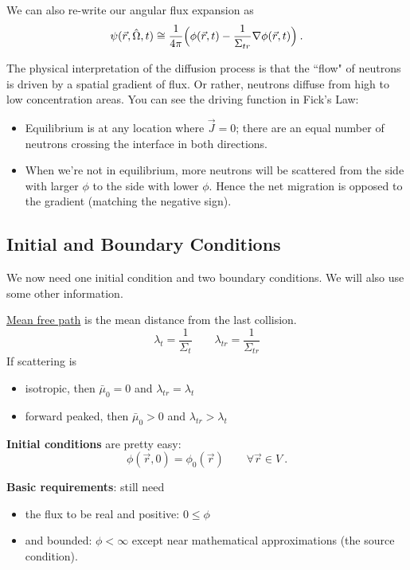 \documentclass[12pt]{article}
\newcommand{\vOmega}{\ensuremath{\hat{\Omega}}}
\begin{document}
We can also re-write our angular flux expansion as
\[\psi(\vec{r}, \vOmega, t) \cong \frac{1}{4\pi}\Bigl(\phi(\vec{r}, t)  -\frac{1}{\Sigma_{tr}} \nabla \phi(\vec{r}, t)\Bigr) \:.\]

The physical interpretation of the diffusion process is that the ``flow" of neutrons is driven by a spatial gradient of flux. Or rather, neutrons diffuse from high to low concentration areas. You can see the driving function in Fick's Law: 
%
\begin{itemize}
\item Equilibrium is at any location where $\vec{J} = 0$; there are an equal number of neutrons crossing the interface in both directions.
\item When we're not in equilibrium, more neutrons will be scattered from the side with larger $\phi$ to the side with lower $\phi$. Hence the net migration is opposed to the gradient (matching the negative sign). 
\end{itemize}
 

\subsection*{Initial and Boundary Conditions}

We now need one initial condition and two boundary conditions. We will also use some other information.

\underline{Mean free path} is the mean distance from the last collision.
\[\lambda_{t} = \frac{1}{\Sigma_t} \qquad \lambda_{tr} = \frac{1}{\Sigma_{tr}}\]
%
If scattering is 
\begin{itemize}
\item isotropic, then $\bar{\mu}_0 = 0$ and $\lambda_{tr} = \lambda_{t}$
\item forward peaked, then $\bar{\mu}_0 > 0$ and $\lambda_{tr} > \lambda_{t}$
\end{itemize}	

\textbf{Initial conditions} are pretty easy:
\[\phi(\vec{r}, 0) = \phi_0(\vec{r}) \qquad \forall \vec{r} \in V \:.\]

\textbf{Basic requirements}: still need 
\begin{itemize}
\item the flux to be real and positive: $0 \leq \phi$
\item and bounded: $\phi < \infty$ except near mathematical approximations (the source condition). 
\end{itemize}
\end{document}
